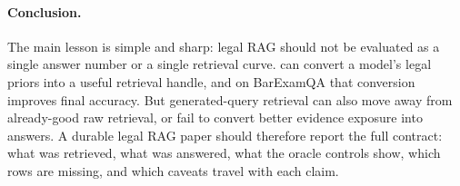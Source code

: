 \paragraph{Conclusion.}
The main lesson is simple and sharp: legal RAG should not be evaluated as a
single answer number or a single retrieval curve. \hyre{} can convert a model's
legal priors into a useful retrieval handle, and on BarExamQA that conversion
improves final accuracy. But generated-query retrieval can also move away from
already-good raw retrieval, or fail to convert better evidence exposure into
answers. A durable legal RAG paper should therefore report the full contract:
what was retrieved, what was answered, what the oracle controls show, which
rows are missing, and which caveats travel with each claim.
